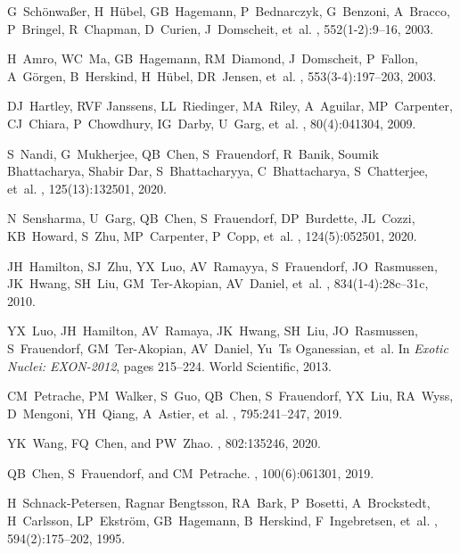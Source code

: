 \documentclass[myclassdoc,debug]{rjparticle}
\begin{document}
\begin{thebibliography}{99}
G~Sch{\"o}nwa{\ss}er, H~H{\"u}bel, GB~Hagemann, P~Bednarczyk, G~Benzoni,
  A~Bracco, P~Bringel, R~Chapman, D~Curien, J~Domscheit, et~al.
, 552(1-2):9--16, 2003.

H~Amro, WC~Ma, GB~Hagemann, RM~Diamond, J~Domscheit, P~Fallon, A~G{\"o}rgen,
  B~Herskind, H~H{\"u}bel, DR~Jensen, et~al.
, 553(3-4):197--203, 2003.

DJ~Hartley, RVF Janssens, LL~Riedinger, MA~Riley, A~Aguilar, MP~Carpenter,
  CJ~Chiara, P~Chowdhury, IG~Darby, U~Garg, et~al.
, 80(4):041304, 2009.

S~Nandi, G~Mukherjee, QB~Chen, S~Frauendorf, R~Banik, Soumik Bhattacharya,
  Shabir Dar, S~Bhattacharyya, C~Bhattacharya, S~Chatterjee, et~al.
, 125(13):132501, 2020.

N~Sensharma, U~Garg, QB~Chen, S~Frauendorf, DP~Burdette, JL~Cozzi, KB~Howard,
  S~Zhu, MP~Carpenter, P~Copp, et~al.
, 124(5):052501, 2020.

JH~Hamilton, SJ~Zhu, YX~Luo, AV~Ramayya, S~Frauendorf, JO~Rasmussen, JK~Hwang,
  SH~Liu, GM~Ter-Akopian, AV~Daniel, et~al.
, 834(1-4):28c--31c, 2010.

YX~Luo, JH~Hamilton, AV~Ramaya, JK~Hwang, SH~Liu, JO~Rasmussen, S~Frauendorf,
  GM~Ter-Akopian, AV~Daniel, Yu~Ts Oganessian, et~al.
\newblock In {\em Exotic Nuclei: EXON-2012}, pages 215--224. World Scientific,
  2013.

CM~Petrache, PM~Walker, S~Guo, QB~Chen, S~Frauendorf, YX~Liu, RA~Wyss,
  D~Mengoni, YH~Qiang, A~Astier, et~al.
, 795:241--247, 2019.

YK~Wang, FQ~Chen, and PW~Zhao.
, 802:135246, 2020.

QB~Chen, S~Frauendorf, and CM~Petrache.
, 100(6):061301, 2019.

H~Schnack-Petersen, Ragnar Bengtsson, RA~Bark, P~Bosetti, A~Brockstedt,
  H~Carlsson, LP~Ekstr{\"o}m, GB~Hagemann, B~Herskind, F~Ingebretsen, et~al.
, 594(2):175--202, 1995.


\end{thebibliography}
\end{document}
